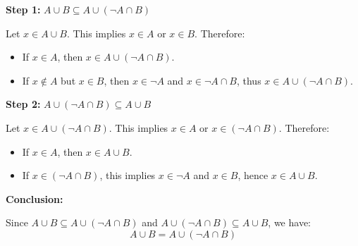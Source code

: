 \documentclass{article}
\begin{document}
\textbf{Step 1:} \( A \cup B \subseteq A \cup (\neg A \cap B) \)

Let \( x \in A \cup B \). This implies \( x \in A \) or \( x \in B \). Therefore:
\begin{itemize}
  \item If \( x \in A \), then \( x \in A \cup (\neg A \cap B) \).
  \item If \( x \notin A \) but \( x \in B \), then \( x \in \neg A \) and \( x \in \neg A \cap B \), thus \( x \in A \cup (\neg A \cap B) \).
\end{itemize}

\textbf{Step 2:} \( A \cup (\neg A \cap B) \subseteq A \cup B \)

Let \( x \in A \cup (\neg A \cap B) \). This implies \( x \in A \) or \( x \in (\neg A \cap B) \). Therefore:
\begin{itemize}
  \item If \( x \in A \), then \( x \in A \cup B \).
  \item If \( x \in (\neg A \cap B) \), this implies \( x \in \neg A \) and \( x \in B \), hence \( x \in A \cup B \).
\end{itemize}

\textbf{Conclusion:}

Since \( A \cup B \subseteq A \cup (\neg A \cap B) \) and \( A \cup (\neg A \cap B) \subseteq A \cup B \), we have:
\[ A \cup B = A \cup (\neg A \cap B) \]
\end{document}
